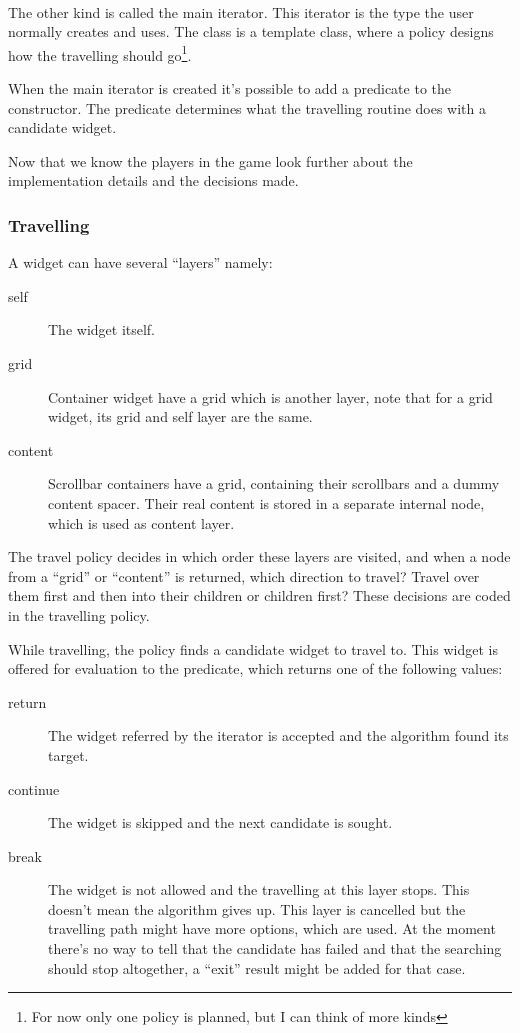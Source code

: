 \documentclass[a4paper,notitlepage]{report}
\begin{document}
\paragraph{}

The other kind is called the main iterator. This iterator is the type the user
normally creates and uses. The class is a template class, where a policy designs
how the travelling should go\footnote{For now only one policy is planned, but I
can think of more kinds}.

When the main iterator is created it's possible to add a predicate to the
constructor. The predicate determines what the travelling routine does with a
candidate widget.

Now that we know the players in the game look further about the implementation
details and the decisions made.

\subsubsection{Travelling}

A widget can have several ``layers'' namely:

\begin{description}
\item[self] The widget itself.
\item[grid] Container widget have a grid which is another layer, note that for a
	grid widget, its grid and self layer are the same.
\item[content] Scrollbar containers have a grid, containing their scrollbars and
	a dummy content spacer. Their real content is stored in a separate internal
	node, which is used as content layer.
\end{description}

The travel policy decides in which order these layers are visited, and when a
node from a ``grid'' or ``content'' is returned, which direction to travel?
Travel over them first and then into their children or children first? These
decisions are coded in the travelling policy.

While travelling, the policy finds a candidate widget to travel to. This widget is
offered for evaluation to the predicate, which returns one of the following
values:

\begin{description}
\item[return] The widget referred by the iterator is accepted and the algorithm
	found its target.
\item[continue] The widget is skipped and the next candidate is sought.
\item[break] The widget is not allowed and the travelling at this layer stops.
	This doesn't mean the algorithm gives up. This layer is cancelled but the
	travelling path might have more options, which are used. At the moment there's
	no way to tell that the candidate has failed and that the searching should stop
	altogether, a ``exit'' result might be added for that case.
\end{description}
\end{document}
